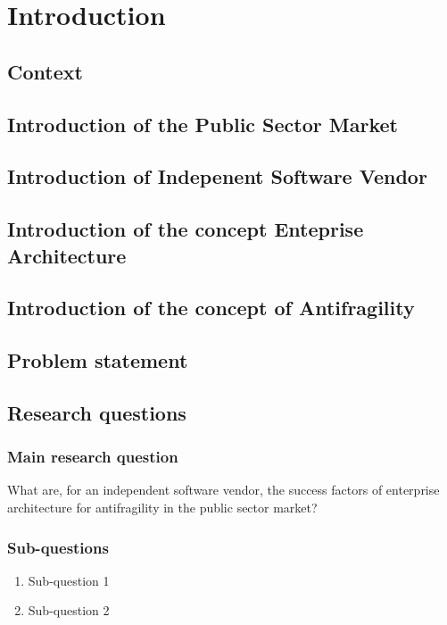 \chapter{Introduction}
\label{ch:introduction}
\lipsum[1]

\section{Context}
\label{sec:context}
\lipsum[1]

\section{Introduction of the Public Sector Market}
\label{sec:intropublicsector}
\lipsum[1]

\section{Introduction of Indepenent Software Vendor}
\label{sec:introisv}
\lipsum[1]

\section{Introduction of the concept Enteprise Architecture}
\label{introea}
\lipsum[1]

\section{Introduction of the concept of Antifragility}
\label{sec:introantifragility}
\lipsum[1]

\section{Problem statement}
\label{sec:problemstatement}

\section{Research questions}
\label{sec:research-questions}

\subsection{Main research question}
\label{sub:main-research-question}
What are, for an independent software vendor, the success factors of enterprise architecture for antifragility in the public sector market?

\subsection{Sub-questions}
\label{sub:sub-questions}

\begin{enumerate}
	\item{Sub-question 1}
	\item{Sub-question 2}
\end{enumerate}
